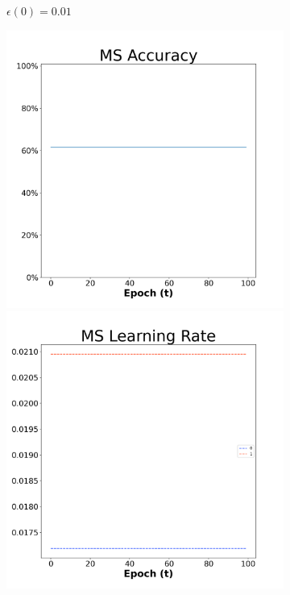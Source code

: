 \begin{figure}[H]
\begin{subfigure}{0.3\textwidth}
  \caption{$\epsilon(0)=0.01$}
\end{subfigure}\hfil %
\begin{subfigure}{0.3\textwidth}
  \includegraphics[width=\linewidth]{images/exper1/SP/MS_0.03_acc.png}
  \includegraphics[width=\linewidth]{images/exper1/SP/MS_0.03_lr.png}

\end{subfigure}
\end{figure}
